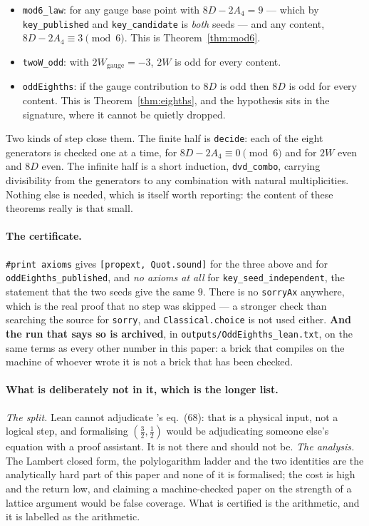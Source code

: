 \documentclass[11pt,a4paper]{article}
\begin{document}
\begin{itemize}\itemsep2pt
\item \texttt{mod6\_law}: for any gauge base point with $8D-2A_4=9$ --- which by
  \texttt{key\_published} and \texttt{key\_candidate} is \emph{both} seeds --- and any content,
  $8D-2A_4\equiv3\pmod6$. This is Theorem~\ref{thm:mod6}.
\item \texttt{twoW\_odd}: with $2W_{\text{gauge}}=-3$, $2W$ is odd for every content.
\item \texttt{oddEighths}: if the gauge contribution to $8D$ is odd then $8D$ is odd for every
  content. This is Theorem~\ref{thm:eighths}, and the hypothesis sits in the signature, where it
  cannot be quietly dropped.
\end{itemize}

\noindent Two kinds of step close them. The finite half is \texttt{decide}: each of the eight
generators is checked one at a time, for $8D-2A_4\equiv0\pmod6$ and for $2W$ even and $8D$ even.
The infinite half is a short induction, \texttt{dvd\_combo}, carrying divisibility from the
generators to any combination with natural multiplicities. Nothing else is needed, which is itself
worth reporting: the content of these theorems really is that small.

\paragraph{The certificate.} \texttt{\#print axioms} gives \texttt{[propext, Quot.sound]} for the
three above and for \texttt{oddEighths\_published}, and \emph{no axioms at all} for
\texttt{key\_seed\_independent}, the statement that the two seeds give the same $9$. There is no
\texttt{sorryAx} anywhere, which is the real proof that no step was skipped --- a stronger check
than searching the source for \texttt{sorry}, and \texttt{Classical.choice} is not used either.
\textbf{And the run that says so is archived}, in
\texttt{outputs/\allowbreak OddEighths\_\allowbreak lean.txt}, on the same terms as every other
number in this paper: a brick that compiles on the machine of whoever wrote it is not a brick that
has been checked.

\paragraph{What is deliberately not in it, which is the longer list.} \emph{The split.} Lean cannot
adjudicate \cite{KM25}'s eq.~(68): that is a physical input, not a logical step, and formalising
$(\tfrac32,\tfrac12)$ would be adjudicating someone else's equation with a proof assistant. It is
not there and should not be. \emph{The analysis.} The Lambert closed form, the polylogarithm ladder
and the two identities are the analytically hard part of this paper and none of it is formalised;
the cost is high and the return low, and claiming a machine-checked paper on the strength of a
lattice argument would be false coverage. What is certified is the arithmetic, and it is labelled
as the arithmetic.
\end{document}
